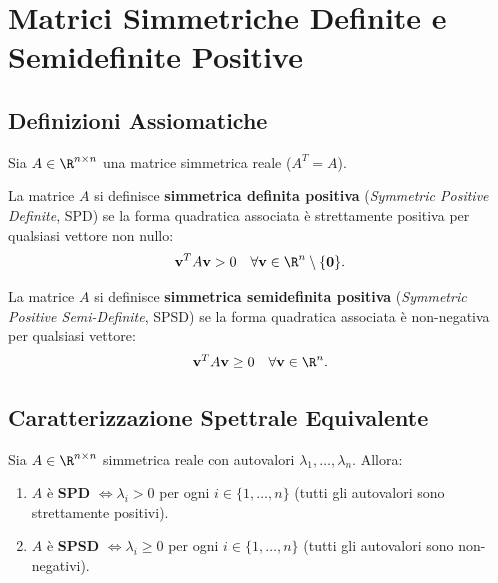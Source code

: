 \FloatBarrier
\section{Matrici Simmetriche Definite e Semidefinite Positive}
\label{sec:matrici-spd-spsd}

\subsection{Definizioni Assiomatiche}

Sia $A \in \R^{n \times n}$ una matrice simmetrica reale ($A^T = A$).

\begin{definition}
La matrice $A$ si definisce \textbf{simmetrica definita positiva} (\textit{Symmetric Positive Definite}, SPD) se la forma quadratica associata \`e strettamente positiva per qualsiasi vettore non nullo:
\begin{equation}
    \mathbf{v}^T A \mathbf{v} > 0 \quad \forall \mathbf{v} \in \R^n \setminus \{\mathbf{0}\}.
\end{equation}
\end{definition}

\begin{definition}
La matrice $A$ si definisce \textbf{simmetrica semidefinita positiva} (\textit{Symmetric Positive Semi-Definite}, SPSD) se la forma quadratica associata \`e non-negativa per qualsiasi vettore:
\begin{equation}
    \mathbf{v}^T A \mathbf{v} \ge 0 \quad \forall \mathbf{v} \in \R^n.
\end{equation}
\end{definition}

\subsection{Caratterizzazione Spettrale Equivalente}

\begin{theorem}
\label{thm:criterio-spettrale-spd}
Sia $A \in \R^{n \times n}$ simmetrica reale con autovalori $\lambda_1, \dots, \lambda_n$. Allora:
\begin{enumerate}
    \item $A$ \`e \textbf{SPD} $\iff \lambda_i > 0$ per ogni $i \in \{1, \dots, n\}$ (tutti gli autovalori sono strettamente positivi).
    \item $A$ \`e \textbf{SPSD} $\iff \lambda_i \ge 0$ per ogni $i \in \{1, \dots, n\}$ (tutti gli autovalori sono non-negativi).
\end{enumerate}
\end{theorem}

